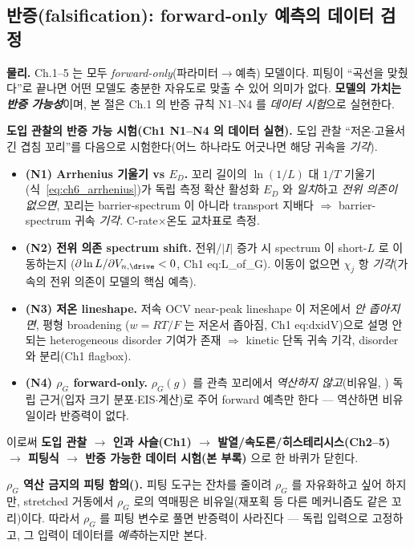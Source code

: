 \subsection{반증(falsification): forward-only 예측의 데이터 검정}\label{sec:ch6_falsify}
\textbf{물리.} Ch.1--5 는 모두 \emph{forward-only}(파라미터$\to$예측) 모델이다. 피팅이 ``곡선을 맞췄다''로 끝나면
어떤 모델도 충분한 자유도로 맞출 수 있어 의미가 없다. \textbf{모델의 가치는 \emph{반증 가능성}}이며, 본 절은 Ch.1
의 반증 규칙 N1--N4 를 \emph{데이터 시험}으로 실현한다.
\begin{loopbox}
\textbf{도입 관찰의 반증 가능 시험(Ch1 N1--N4 의 데이터 실현).} 도입 관찰 ``저온$\cdot$고율서 긴 겹침 꼬리''를
다음으로 시험한다(어느 하나라도 어긋나면 해당 귀속을 \emph{기각}).
\begin{itemize}[leftmargin=1.6em]
\item \textbf{(N1) Arrhenius 기울기 vs $E_D$.} 꼬리 길이의 $\ln(1/L)$ 대 $1/T$ 기울기(식~\eqref{eq:ch6_arrhenius})가
  독립 측정 확산 활성화 $E_D$ 와 \emph{일치}하고 \emph{전위 의존이 없으면}, 꼬리는 barrier-spectrum 이 아니라
  transport 지배다 $\Rightarrow$ barrier-spectrum 귀속 \emph{기각}. C-rate$\times$온도 교차표로 측정.
\item \textbf{(N2) 전위 의존 spectrum shift.} 전위/$|I|$ 증가 시 spectrum 이 short-$L$ 로 이동하는지
  ($\partial\ln L/\partial V_{n,\drive}<0$, Ch1 eq:L\_of\_G). 이동이 없으면 $\chi_j$ 항 \emph{기각}(가속의 전위
  의존이 모델의 핵심 예측).
\item \textbf{(N3) 저온 lineshape.} 저속 OCV near-peak lineshape 이 저온에서 \emph{안 좁아지면}, 평형 broadening
  ($w=RT/F$ 는 저온서 좁아짐, Ch1 eq:dxidV)으로 설명 안 되는 heterogeneous disorder 기여가 존재 $\Rightarrow$
  kinetic 단독 귀속 기각, disorder 와 분리(Ch1 flagbox).
\item \textbf{(N4) $\rho_G$ forward-only.} $\rho_G(g)$ 를 관측 꼬리에서 \emph{역산하지 않고}(비유일, )
  독립 근거(입자 크기 분포$\cdot$EIS$\cdot$계산)로 주어 forward 예측만 한다 — 역산하면 비유일이라 반증력이 없다.
\end{itemize}
이로써 \textbf{도입 관찰 $\to$ 인과 사슬(Ch1) $\to$ 발열/속도론/히스테리시스(Ch2--5) $\to$ 피팅식 $\to$ 반증
가능한 데이터 시험(본 부록)} 으로 한 바퀴가 닫힌다.
\end{loopbox}
\begin{boundbox}
\textbf{$\rho_G$ 역산 금지의 피팅 함의().} 피팅 도구는 잔차를 줄이려 $\rho_G$ 를 자유화하고 싶어 하지만,
stretched 거동에서 $\rho_G$ 로의 역매핑은 비유일(재포획 등 다른 메커니즘도 같은 꼬리)이다. 따라서 $\rho_G$ 를
피팅 변수로 풀면 반증력이 사라진다 — 독립 입력으로 고정하고, 그 입력이 데이터를 \emph{예측}하는지만 본다.
\end{boundbox}


